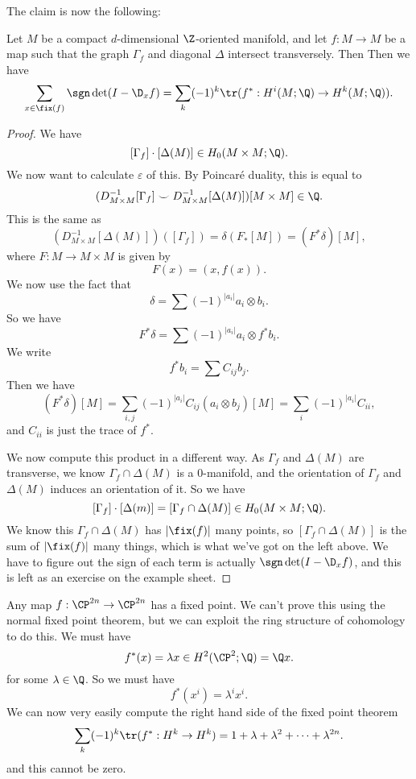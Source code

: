 \documentclass[a4paper]{article}
\theoremstyle{definition}
\begin{document}
The claim is now the following:
\begin{thm}
  Let $M$ be a compact $d$-dimensional $\Z$-oriented manifold, and let $f: M \to M$ be a map such that the graph $\Gamma_f$ and diagonal $\Delta$ intersect transversely. Then
  Then we have
  \[
    \sum_{x \in \fix(f)} \sgn \det(I - \D_x f) = \sum_k (-1)^k \tr(f^*: H^i(M; \Q) \to H^k(M; \Q)).
  \]
\end{thm}
\begin{proof}
  We have
  \[
    [\Gamma_f] \cdot [\Delta (M)] \in H_0(M \times M; \Q).
  \]
  We now want to calculate $\varepsilon$ of this. By Poincar\'e duality, this is equal to
  \[
    (D_{M \times M}^{-1}[\Gamma_f] \smile D_{M \times M}^{-1}[\Delta(M)])[M \times M] \in \Q.
  \]
  This is the same as
  \[
    (D_{M \times M}^{-1} [\Delta(M)]) ([\Gamma_f]) = \delta(F_*[M]) = (F^* \delta)[M],
  \]
  where $F: M \to M \times M$ is given by
  \[
    F(x) = (x, f(x)).
  \]
  We now use the fact that
  \[
    \delta = \sum (-1)^{|a_i|} a_i \otimes b_i.
  \]
  So we have
  \[
    F^* \delta = \sum (-1)^{|a_i|} a_i \otimes f^* b_i.
  \]
  We write
  \[
    f^* b_i = \sum C_{ij} b_j.
  \]
  Then we have
  \[
    (F^* \delta)[M] = \sum_{i, j} (-1)^{|a_i|} C_{ij} (a_i \otimes b_j) [M] = \sum_i (-1)^{|a_i|} C_{ii},
  \]
  and $C_{ii}$ is just the trace of $f^*$.

  We now compute this product in a different way. As $\Gamma_f$ and $\Delta (M)$ are transverse, we know $\Gamma_f \cap \Delta(M)$ is a $0$-manifold, and the orientation of $\Gamma_f$ and $\Delta(M)$ induces an orientation of it. So we have
  \[
    [\Gamma_f] \cdot [\Delta(m)] = [\Gamma_f \cap \Delta(M)] \in H_0(M \times M; \Q).
  \]
  We know this $\Gamma_f \cap \Delta(M)$ has $|\fix(f)|$ many points, so $[\Gamma_f \cap \Delta(M)]$ is the sum of $|\fix(f)|$ many things, which is what we've got on the left above. We have to figure out the sign of each term is actually $\sgn \det(I - \D_x f)$, and this is left as an exercise on the example sheet.
\end{proof}

\begin{eg}
  Any map $f: \CP^{2n} \to \CP^{2n}$ has a fixed point. We can't prove this using the normal fixed point theorem, but we can exploit the ring structure of cohomology to do this. We must have
  \[
    f^*(x) = \lambda x \in H^2(\CP^2; \Q) = \Q x.
  \]
  for some $\lambda \in \Q$. So we must have
  \[
    f^*(x^i) = \lambda^i x^i.
  \]
  We can now very easily compute the right hand side of the fixed point theorem
  \[
    \sum_k (-1)^k \tr(f^*: H^k \to H^k) = 1 + \lambda + \lambda^2 + \cdots + \lambda^{2n}.
  \]
  and this cannot be zero.
\end{eg}

\printindex
\end{document}
